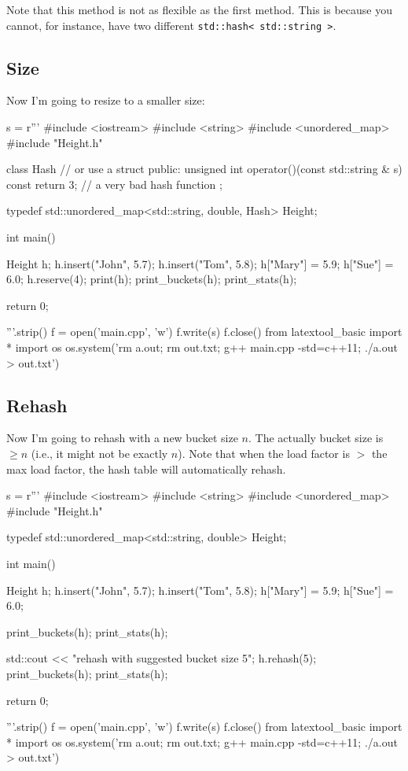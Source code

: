 Note that this method is not as flexible as the first method.
This is because you cannot, for instance, have two different
\verb!std::hash< std::string >!.


\subsection{Size}

Now I'm going to resize to a smaller size:

\begin{python}
s = r'''
#include <iostream>
#include <string>
#include <unordered_map>
#include "Height.h"

class Hash // or use a struct
{
public:
    unsigned int operator()(const std::string & s) const
    {
        return 3; // a very bad hash function
    }
};

typedef std::unordered_map<std::string, double, Hash> Height;

int main()
{
    Height h;
    h.insert({"John", 5.7});
    h.insert({"Tom", 5.8});
    h["Mary"] = 5.9;
    h["Sue"] = 6.0;
    h.reserve(4);
    print(h);
    print_buckets(h);
    print_stats(h);
              
    return 0;
}
'''.strip()
f = open('main.cpp', 'w')
f.write(s)
f.close()
from latextool_basic import *
import os
os.system('rm a.out; rm out.txt; g++ main.cpp -std=c++11; ./a.out > out.txt')
\end{python}
\vspace{-0.1cm}
{\small
{}
}



\subsection{Rehash}

Now I'm going to rehash with a new bucket size $n$.
The actually bucket size is $\geq n$ (i.e., it might not be exactly $n$).
Note that when the load factor is $>$ the max load factor, the hash table
will automatically rehash.

\begin{python}
s = r'''
#include <iostream>
#include <string>
#include <unordered_map>
#include "Height.h"

typedef std::unordered_map<std::string, double> Height;

int main()
{
    Height h;
    h.insert({"John", 5.7});
    h.insert({"Tom", 5.8});
    h["Mary"] = 5.9;
    h["Sue"] = 6.0;

    print_buckets(h);
    print_stats(h);

    std::cout << "rehash with suggested bucket size 5\n";
    h.rehash(5);
    print_buckets(h);
    print_stats(h);
    
    return 0;
}
'''.strip()
f = open('main.cpp', 'w')
f.write(s)
f.close()
from latextool_basic import *
import os
os.system('rm a.out; rm out.txt; g++ main.cpp -std=c++11; ./a.out > out.txt')
\end{python}
\vspace{-0.1cm}
{\small
{}
}

